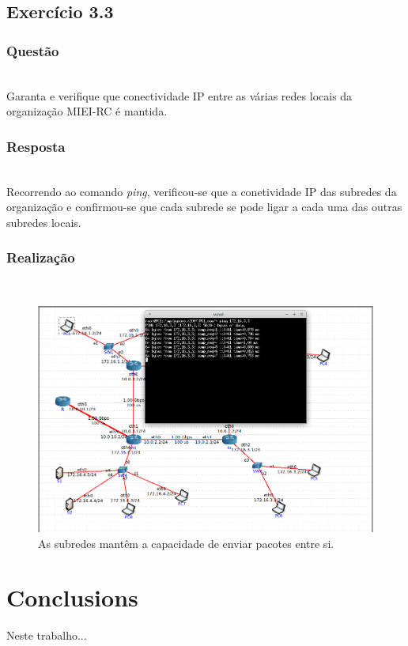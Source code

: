 \documentclass{llncs}
\begin{document}
\subsection{Exercício 3.3}
\subsubsection{Questão}\rule[-10pt]{0pt}{10pt}\\

Garanta e verifique que conectividade IP entre as várias redes locais da organização MIEI-RC é mantida.

\subsubsection{Resposta}\rule[-10pt]{0pt}{10pt}\\

Recorrendo ao comando \textit{ping}, verificou-se que a conetividade IP das subredes da organização e confirmou-se que cada subrede se pode ligar a cada uma das outras subredes locais.

\subsubsection{Realização}\rule[-10pt]{0pt}{10pt}\\ 


\begin{figure}
	\begin{center}
	\includegraphics[scale=0.35]{./imagens/exercicio3_3.png} 
	\end{center}
	\caption{\label{fig:ping}As subredes mantêm a capacidade de enviar pacotes entre si.}
\end{figure} 



\section{Conclusions}
Neste trabalho...



\end{document}
